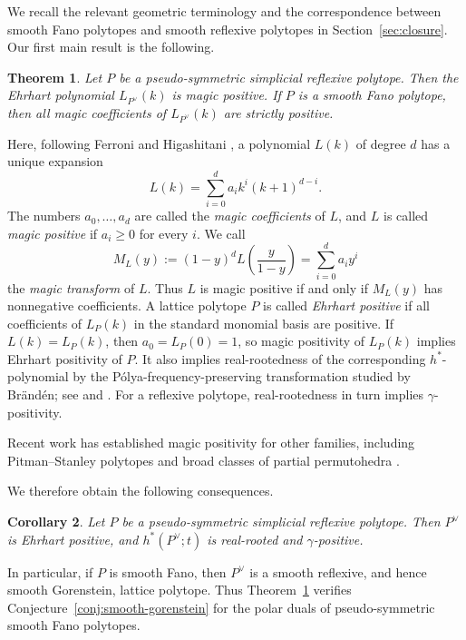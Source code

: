 \documentclass[12pt]{amsart}
\newtheorem{Theorem}{Theorem}[section]
\newtheorem{Corollary}[Theorem]{Corollary}
\theoremstyle{definition}
\begin{document}
We recall the relevant geometric terminology and the correspondence
between smooth Fano polytopes and smooth reflexive polytopes in
Section~\ref{sec:closure}.  Our first main result is the following.

\begin{Theorem}\label{thm:pseudo-symmetric-main}
Let $P$ be a pseudo-symmetric simplicial reflexive polytope.
Then the Ehrhart polynomial $L_{P^\vee}(k)$ is magic positive.
If $P$ is a smooth Fano polytope, then all magic coefficients of
$L_{P^\vee}(k)$ are strictly positive.
\end{Theorem}

Here, following Ferroni and Higashitani
\cite[Section~4.5]{FerroniHigashitani}, a polynomial $L(k)$ of degree $d$ has a unique expansion
\[
L(k)=\sum_{i=0}^d a_i k^i(k+1)^{d-i}.
\]
The numbers $a_0,\ldots,a_d$ are called the \emph{magic coefficients}
of $L$, and $L$ is called \emph{magic positive} if $a_i\ge0$ for every $i$.
We call
\[
M_L(y)
:=
(1-y)^dL\left(\frac{y}{1-y}\right)
=
\sum_{i=0}^d a_i y^i
\]
the \emph{magic transform} of $L$.
Thus $L$ is magic positive if and only if $M_L(y)$ has nonnegative
coefficients.
A lattice polytope $P$ is called \emph{Ehrhart positive} if all
coefficients of $L_P(k)$ in the standard monomial basis are positive.
If $L(k)=L_P(k)$, then $a_0=L_P(0)=1$, so magic positivity of $L_P(k)$
implies Ehrhart positivity of $P$.  It also implies real-rootedness of the
corresponding $h^*$-polynomial by the P\'olya-frequency-preserving
transformation studied by Br\"and\'en; see
\cite{BrandenPF} and \cite[Theorem~4.19]{FerroniHigashitani}.  For a
reflexive polytope, real-rootedness in turn implies $\gamma$-positivity.

Recent work has established magic positivity for other families, including
Pitman--Stanley polytopes and broad classes of partial permutohedra
\cite{AvilaFerroniMorales,LiuZhangPartialPermutohedra}.

We therefore obtain the following consequences.

\begin{Corollary}\label{cor:fano-consequences}
Let $P$ be a pseudo-symmetric simplicial reflexive polytope.
Then $P^\vee$ is Ehrhart positive, and $h^*(P^\vee;t)$ is
real-rooted and $\gamma$-positive.
\end{Corollary}
In particular, if $P$ is smooth Fano, then $P^\vee$ is a smooth
reflexive, and hence smooth Gorenstein, lattice polytope.
Thus Theorem~\ref{thm:pseudo-symmetric-main} verifies
Conjecture~\ref{conj:smooth-gorenstein} for the polar duals of
pseudo-symmetric smooth Fano polytopes.
\end{document}
